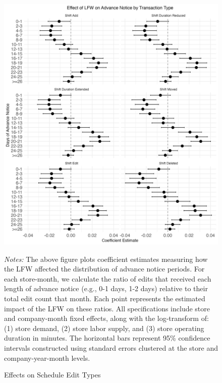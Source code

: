 \documentclass[letterpaper,11pt,leqno]{article}
\theoremstyle{paper}
\newcommand{\note}[2][]{\parbox{\textwidth}{\footnotesize\vspace*{10pt}\textit{#1}#2}}
\begin{document}
\begin{figure}[!htb]
\centering
\caption{Effects on Schedule Edit Types}
\includegraphics[scale=0.15]{Figures_Revision_2/advance_notice_gen_plot_new_ols.jpeg}
\vspace{-0.50cm}
\note{\scriptsize \singlespacing \textit{Notes: } The above figure plots coefficient estimates measuring how the LFW affected the distribution of advance notice periods. For each store-month, we calculate the ratio of edits that received each length of advance notice (e.g., 0-1 days, 1-2 days) relative to their total edit count that month. Each point represents the estimated impact of the LFW on these ratios. All specifications include store and company-month fixed effects, along with the log-transform of: (1) store demand, (2) store labor supply, and (3) store operating duration in minutes. The horizontal bars represent 95\% confidence intervals constructed using standard errors clustered at the store and company-year-month levels. }
\label{f:adv_notice_gen}
\end{figure}
\end{document}
